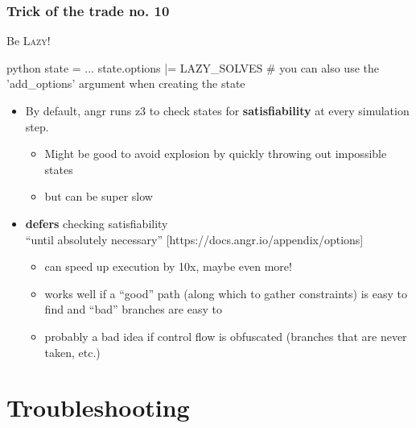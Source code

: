 \documentclass[aspectratio=169]{beamer}
\begin{document}
\begin{frame}[fragile]
    \frametitle{Trick of the trade no. 10}
    \begin{center}
        {\Large Be \textsc{Lazy}!}
    \end{center}
    \begin{codebox}{python}
state = ...
state.options |= {LAZY_SOLVES}
# you can also use the 'add_options' argument when creating the state\end{codebox}

\pause
\begin{itemize}
    \item By default, angr runs z3 to check states for \textbf{\color{brightgreen} satisfiability} at every simulation step.
    \begin{itemize}
        \item Might be good to avoid explosion by quickly throwing out impossible states
        \item but can be super slow
    \end{itemize}

\pause
    \item {} \textbf{\color{brightpurple}defers} checking satisfiability \\ ``until absolutely necessary'' {\tiny [https://docs.angr.io/appendix/options]}
    \begin{itemize}
        \item can speed up execution by 10x, maybe even more!
\pause
        \item works well if a ``good'' path (along which to gather constraints) is easy to find and ``bad'' branches are easy to 
        \item probably a bad idea if control flow is obfuscated (branches that are never taken, etc.)
    \end{itemize}
\end{itemize}

\end{frame}

\section{Troubleshooting}
\end{document}

